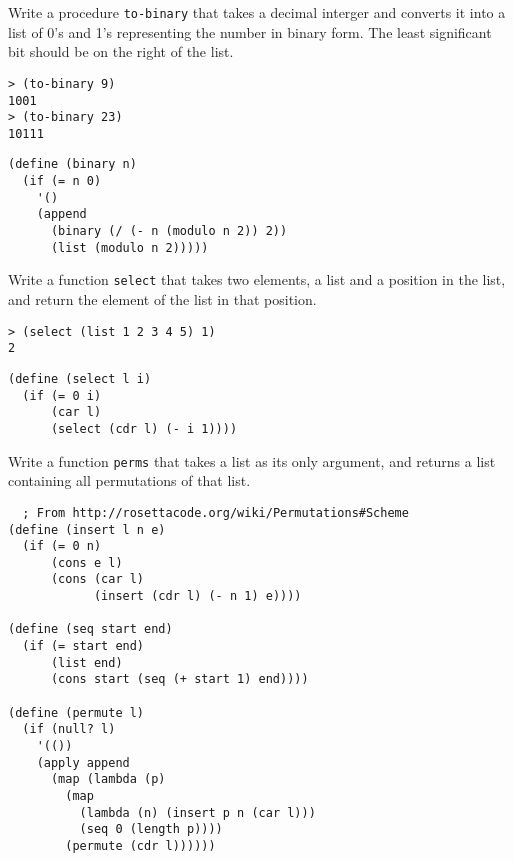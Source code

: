 \documentclass[addpoints,12pt,a4paper]{exam}
\begin{document}
\begin{questions}
\question
Write a procedure \texttt{to-binary} that takes a decimal interger and converts it into a list of 0's and 1's representing the number in binary form.
The least significant bit should be on the right of the list.
\begin{verbatim}
> (to-binary 9)
1001
> (to-binary 23)
10111
\end{verbatim}

\begin{solution}
  \begin{verbatim}
(define (binary n)
  (if (= n 0)
    '()
    (append
      (binary (/ (- n (modulo n 2)) 2))
      (list (modulo n 2)))))
  \end{verbatim}
\end{solution}

\question
Write a function \texttt{select} that takes two elements, a list and a position in the list, and return the element of the list in that position.
\begin{verbatim}
> (select (list 1 2 3 4 5) 1)
2
\end{verbatim}

\begin{solution}
  \begin{verbatim}
(define (select l i)
  (if (= 0 i)
      (car l)
      (select (cdr l) (- i 1))))
  \end{verbatim}
\end{solution}

\question
Write a function \texttt{perms} that takes a list as its only argument, and returns a list containing all permutations of that list.

\begin{solution}
  \begin{verbatim}
  ; From http://rosettacode.org/wiki/Permutations#Scheme
(define (insert l n e)
  (if (= 0 n)
      (cons e l)
      (cons (car l) 
            (insert (cdr l) (- n 1) e))))
 
(define (seq start end)
  (if (= start end)
      (list end)
      (cons start (seq (+ start 1) end))))
 
(define (permute l)
  (if (null? l)
    '(())
    (apply append
      (map (lambda (p)
        (map
          (lambda (n) (insert p n (car l)))
          (seq 0 (length p))))
        (permute (cdr l))))))
  \end{verbatim}
\end{solution}

\end{questions}



\end{document}
